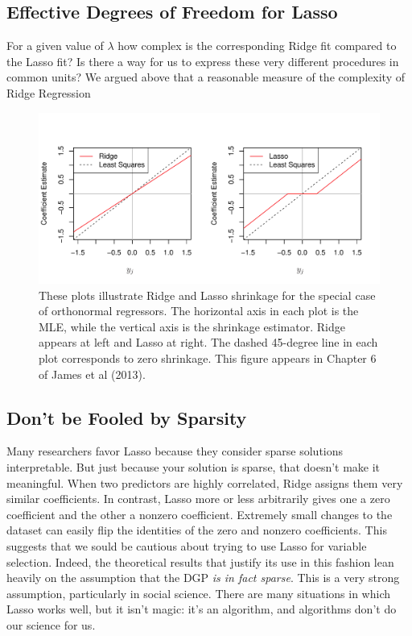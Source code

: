 \documentclass[12pt]{article}
\theoremstyle{definition}
\begin{document}
\subsection{Effective Degrees of Freedom for Lasso}
For a given value of $\lambda$ how complex is the corresponding Ridge fit compared to the Lasso fit? Is there a way for us to express these very different procedures in common units? We argued above that a reasonable measure of the complexity of Ridge Regression 

\begin{figure}
	\centering
	\includegraphics[scale=0.7]{ISLR_ch6_fig10}
	\caption{These plots illustrate Ridge and Lasso shrinkage for the special case of orthonormal regressors. The horizontal axis in each plot is the MLE, while the vertical axis is the shrinkage estimator. Ridge appears at left and Lasso at right. The dashed 45-degree line in each plot corresponds to zero shrinkage. This figure appears in Chapter 6 of James et al (2013).}
	\label{fig:ridge_lasso_shrink}
\end{figure}




\subsection{Don't be Fooled by Sparsity}
Many researchers favor Lasso because they consider sparse solutions interpretable. But just because your solution is sparse, that doesn't make it meaningful. When two predictors are highly correlated, Ridge assigns them very similar coefficients. In contrast, Lasso more or less arbitrarily gives one a zero coefficient and the other a nonzero coefficient. Extremely small changes to the dataset can easily flip the identities of the zero and nonzero coefficients. This suggests that we sould be cautious about trying to use Lasso for variable selection. Indeed, the theoretical results that justify its use in this fashion lean heavily on the assumption that the DGP \emph{is in fact sparse}. This is a very strong assumption, particularly in social science. There are many situations in which Lasso works well, but it isn't magic: it's an algorithm, and algorithms don't do our science for us.
\end{document}
